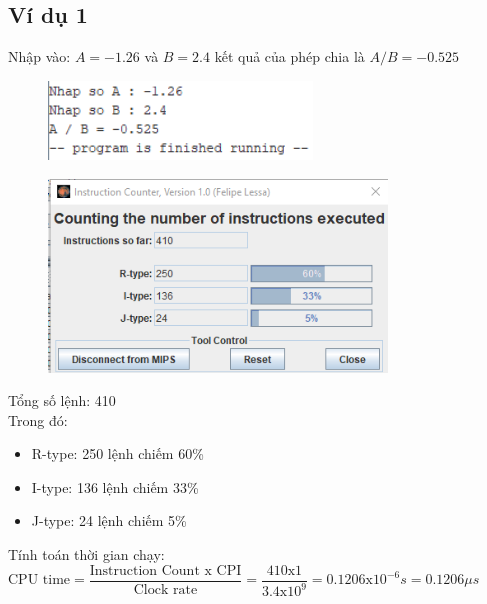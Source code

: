 \documentclass[a4paper]{article}
\begin{document}
\subsection{Ví dụ 1}
Nhập vào: $A = -1.26$ và $B = 2.4$ kết quả của phép chia là $A / B = -0.525$
\begin{center}
	\begin{figure}[h!]
		\begin{center}
			\includegraphics[width=7cm]{Images/0.png}
		\end{center}
	\end{figure}
\end{center}
\begin{center}
	\begin{figure}[h!]
		\begin{center}
			\includegraphics[width=9cm]{Images/3.png}
		\end{center}
	\end{figure}
\end{center}
Tổng số lệnh: 410\\
Trong đó:
\begin{itemize}
	\item R-type: 250 lệnh chiếm 60\%
	\item I-type: 136 lệnh chiếm 33\%
	\item J-type: 24 lệnh chiếm 5\%
\end{itemize}
Tính toán thời gian chạy:\\
$\text{CPU time} = \dfrac{\text{Instruction Count x CPI}}{\text{Clock rate}} = \dfrac{410\text{x}1}{3.4\text{x}10^9} = 0.1206 \text{x}10^{-6} s = 0.1206 \mu s$
\end{document}
